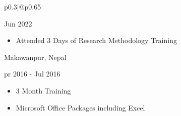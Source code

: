 \documentclass[12pt,a4paper]{article}
\newcommand{\lsubtopic}[3]{
  \begin{minipage}[t]{0.7\linewidth}
    \textbf{\normalsize\selectfont{#1}}
  \end{minipage}
  \hfill
  \begin{minipage}[t]{0.25\linewidth}
    \raggedleft
    {#2\\}
  \end{minipage}
  \par
}
\begin{document}
\begin{multicols}{2}
\begin{tabular}{p{0.3\textwidth}|@{\hspace{5mm}}p{0.65\textwidth}}
{\begin{flushleft}
     Jun 2022
    \begin{itemize}
        \item Attended 3 Days of Research Methodology Training
    \end{itemize}
    
     \lsubtopic{Basic Computer Application Training, 
    College of Information Technology (CIT)}{Makawanpur, Nepal}

     Apr 2016 - Jul 2016
    \begin{itemize}
        \item 3 Month Training
        \item Microsoft Office Packages including Excel
    \end{itemize}
    
\end{flushleft}
}

\end{tabular}
\end{multicols}
\pagebreak
\end{document}
